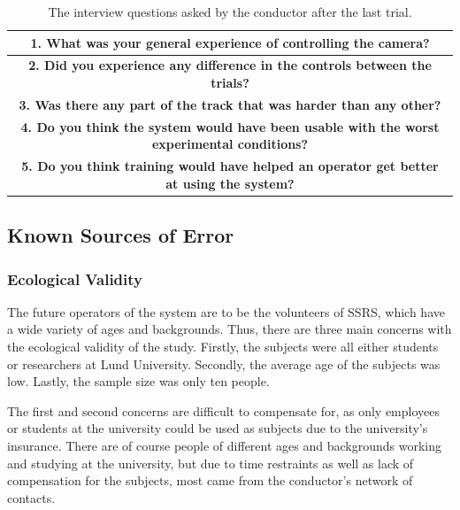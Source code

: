 \documentclass[nofilelist]{cslthse-msc}
\begin{document}
\setlength{\extrarowheight}{5pt}
\vspace{10pt}

\begin{table}[!hbt]
   \centering
      \begin{tabular}{|c|}
         \hline
         \textbf{1. What was your general experience of controlling the camera?} \\
         \hline
         \textbf{2. Did you experience any difference in the controls between the trials?} \\
         \hline
         \textbf{3. Was there any part of the track that was harder than any other?} \\
         \hline
         \textbf{4. Do you think the system would have been usable with the worst experimental conditions?} \\
         \hline
         \textbf{5. Do you think training would have helped an operator get better at using the system?} \\
         \hline
      \end{tabular}
   \caption{The interview questions asked by the conductor after the last trial.}
   \label{tab:interview-questions}
\end{table}

\vspace{10pt}

\subsection{Known Sources of Error}
\label{sources-of-error}

\subsubsection{Ecological Validity}
The future operators of the system are to be the volunteers of SSRS, which have a wide variety of ages and backgrounds. Thus, there are three main concerns with the ecological validity of the study. Firstly, the subjects were all either students or researchers at Lund University. Secondly, the average age of the subjects was low. Lastly, the sample size was only ten people. 

The first and second concerns are difficult to compensate for, as only employees or students at the university could be used as subjects due to the university's insurance. There are of course people of different ages and backgrounds working and studying at the university, but due to time restraints as well as lack of compensation for the subjects, most came from the conductor's network of contacts.
\end{document}
